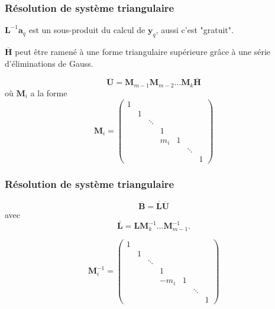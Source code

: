 \documentclass[usepdftitle=false]{beamer}
\def\ba{\boldsymbol{a}}
\def\by{\boldsymbol{y}}
\def\bB{\boldsymbol{B}}
\def\bH{\boldsymbol{H}}
\def\bL{\boldsymbol{L}}
\def\bM{\boldsymbol{M}}
\def\bU{\boldsymbol{U}}
\begin{document}
\begin{frame}
\frametitle{Résolution de système triangulaire}

$\bL^{-1}\ba_q$ est un sous-produit du calcul de $\by_q$, aussi c'est "gratuit".

\mbox{}

$\overline{\bH}$ peut être ramené à une forme triangulaire supérieure grâce à une série d'éliminations de Gauss.

\mbox{}

\[
\overline{\bU} = \bM_{m-1} \bM_{m-2} \ldots \bM_k \overline{\bH}
\]
où $\bM_i$ a la forme
\[
\bM_i =
\begin{pmatrix}
1 \\
& 1 \\
& & \ddots \\
& & & 1 \\
& & & m_i & 1 \\
& & & & & \ddots \\
& & & & & & 1
\end{pmatrix}
\]

\end{frame}

\begin{frame}
\frametitle{Résolution de système triangulaire}

\[
\overline{\bB} = \overline{\bL}\overline{\bU}
\]
avec
\[
\overline{\bL} = \bL\bM_k^{-1}\ldots\bM_{m-1}^{-1}.
\]

\mbox{}

\[
\bM_i^{-1} =
\begin{pmatrix}
1 \\
& 1 \\
& & \ddots \\
& & & 1 \\
& & & -m_i & 1 \\
& & & & & \ddots \\
& & & & & & 1
\end{pmatrix}
\]

\end{frame}
\end{document}

